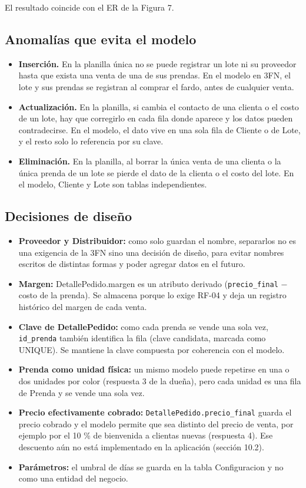 \documentclass[11pt,letterpaper]{article}
\begin{document}
El resultado coincide con el ER de la Figura 7.

\subsection{Anomalías que evita el modelo}
\begin{itemize}
\item \textbf{Inserción.} En la planilla única no se puede registrar un lote ni su proveedor hasta que exista una venta de una de sus prendas. En el modelo en 3FN, el lote y sus prendas se registran al comprar el fardo, antes de cualquier venta.
\item \textbf{Actualización.} En la planilla, si cambia el contacto de una clienta o el costo de un lote, hay que corregirlo en cada fila donde aparece y los datos pueden contradecirse. En el modelo, el dato vive en una sola fila de Cliente o de Lote, y el resto solo lo referencia por su clave.
\item \textbf{Eliminación.} En la planilla, al borrar la única venta de una clienta o la única prenda de un lote se pierde el dato de la clienta o el costo del lote. En el modelo, Cliente y Lote son tablas independientes.
\end{itemize}

\subsection{Decisiones de diseño}
\begin{itemize}
\item \textbf{Proveedor y Distribuidor:} como solo guardan el nombre, separarlos no es una exigencia de la 3FN sino una decisión de diseño, para evitar nombres escritos de distintas formas y poder agregar datos en el futuro.
\item \textbf{Margen:} DetallePedido.margen es un atributo derivado (\texttt{precio\_\allowbreak{}final} − costo de la prenda). Se almacena porque lo exige RF-04 y deja un registro histórico del margen de cada venta.
\item \textbf{Clave de DetallePedido:} como cada prenda se vende una sola vez, \texttt{id\_\allowbreak{}prenda} también identifica la fila (clave candidata, marcada como UNIQUE). Se mantiene la clave compuesta por coherencia con el modelo.
\item \textbf{Prenda como unidad física:} un mismo modelo puede repetirse en una o dos unidades por color (respuesta 3 de la dueña), pero cada unidad es una fila de Prenda y se vende una sola vez.
\item \textbf{Precio efectivamente cobrado:} \texttt{DetallePedido.precio\_\allowbreak{}final} guarda el precio cobrado y el modelo permite que sea distinto del precio de venta, por ejemplo por el 10 \% de bienvenida a clientas nuevas (respuesta 4). Ese descuento aún no está implementado en la aplicación (sección 10.2).
\item \textbf{Parámetros:} el umbral de días se guarda en la tabla Configuracion y no como una entidad del negocio.
\end{itemize}
\end{document}
